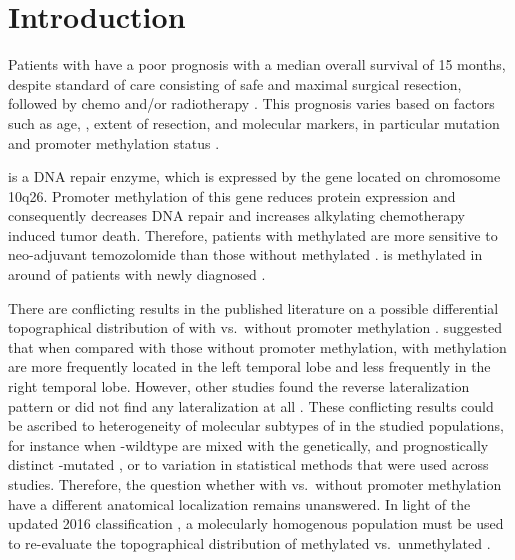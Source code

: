 \section{Introduction}

Patients with  have a poor prognosis with a median overall survival of 15 months, despite standard of care consisting of safe and maximal surgical resection, followed by chemo and/or radiotherapy \autocite{stupp2005radiotherapy}.
This prognosis varies based on factors such as age, , extent of resection, and molecular markers, in particular  mutation and  promoter methylation status \autocite{gessler2018surgery}.

 is a DNA repair enzyme, which is expressed by the  gene located on chromosome 10q26.
Promoter methylation of this gene reduces  protein expression and consequently decreases DNA repair and increases alkylating chemotherapy induced \gls{tumor} death.
Therefore, patients with  methylated  are more sensitive to neo-adjuvant temozolomide than those without  methylated .
 is methylated in around  of patients with newly diagnosed  \autocite{hegi2005MGMT}.

There are conflicting results in the published literature on a possible differential topographical distribution of  with vs.\ without  promoter methylation \autocite{smits2017imaging}.
 suggested that when compared with those without  promoter methylation,  with  methylation are more frequently located in the left temporal lobe and less frequently in the right temporal lobe.
However, other studies found the reverse lateralization pattern \autocite{wang2014anatomical} or did not find any lateralization at all \autocite{carillo2012relationship, eoli2007methylation, han2018structural}.
These conflicting results could be ascribed to heterogeneity of molecular subtypes of  in the studied populations, for instance when -wildtype  are mixed with the genetically, and prognostically distinct -mutated , or to variation in statistical methods that were used across studies.
Therefore, the question whether  with vs.\ without  promoter methylation have a different anatomical localization remains unanswered.
In light of the updated  2016 classification \autocite{louis20162016}, a molecularly homogenous  population must be used to re-evaluate the topographical distribution of  methylated vs.\ unmethylated .

